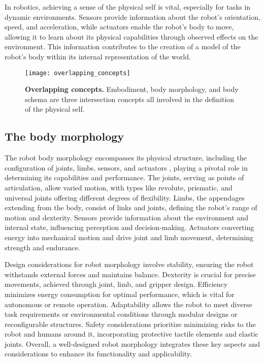In robotics, achieving a sense of the physical self is vital, especially for tasks in dynamic environments. Sensors provide information about the robot's orientation, speed, and acceleration, while actuators enable the robot's body to move, allowing it to learn about its physical capabilities through observed effects on the environment. This information contributes to the creation of a model of the robot's body within its internal representation of the world.
\begin{figure}
	\begin{center}
		\texttt{[image: overlapping\_concepts]}
		\caption{\textbf{Overlapping concepts.} Embodiment, body morphology, and body schema are three intersection concepts all involved in the definition of the physical self.}
		\label{fig:overlapping_concepts}
	\end{center}
\end{figure}

\subsection{The body morphology}
The robot body morphology encompasses its physical structure, including the configuration of joints, limbs, sensors, and actuators \cite{Pfeifer2007SelfOrganizationEmbodiment}, playing a pivotal role in determining its capabilities and performance. The joints, serving as points of articulation, allow varied motion, with types like revolute, prismatic, and universal joints offering different degrees of flexibility. Limbs, the appendages extending from the body, consist of links and joints, defining the robot's range of motion and dexterity. Sensors provide information about the environment and internal state, influencing perception and decision-making. Actuators converting energy into mechanical motion and drive joint and limb movement, determining strength and endurance.

Design considerations for robot morphology involve stability, ensuring the robot withstands external forces and maintains balance. Dexterity is crucial for precise movements, achieved through joint, limb, and gripper design. Efficiency minimizes energy consumption for optimal performance, which is vital for autonomous or remote operation. Adaptability allows the robot to meet diverse task requirements or environmental conditions through modular designs or reconfigurable structures. Safety considerations prioritize minimizing risks to the robot and humans around it, incorporating protective tactile elements and elastic joints. Overall, a well-designed robot morphology integrates these key aspects and considerations to enhance its functionality and applicability.

